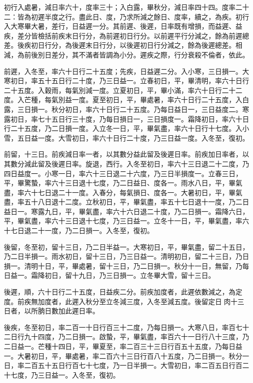 \begin{pinyinscope}
 初行入處暑，減日率六十，度率三十；入白露，畢秋分，減日率四十四。度率二十二：皆為初遲半度之行。盡此日、度，乃求所減之餘日、度率，續之，為疾。初行入大寒畢大暑，差行，日益遲一分。其前遲、後遲，日率既有增損，而益遲、益疾，差分皆檢括前疾末日行分，為前遲初日行分。以前遲平行分減之，餘為前遲總差。後疾初日行分，為後遲末日行分，以後遲初日行分減之，餘為後遲總差。相減，為前後別日差分，其不滿者皆調為小分。遲疾之際，行分衰殺不倫者，依此。



 前遲，入冬至，率六十日行二十五度；先疾，日益遲二分。入小寒，三日損一。大寒初日，率五十五日行二十度，乃三日益一。立春初日，平，畢清明，率六十日行二十五度。入穀雨，每氣別減一度。立夏初日，平，畢小滿，率六十日行二十二度。入芒種，每氣別益一度。夏至初日，平，畢處暑，率六十日行二十五度，入白露，三日損一。秋分初日，率六十日行二十五度。乃每日益日一，三日益度二。寒露初日，率七十五日行三十度，乃每日損日一，三日損度一。霜降初日，率六十日行二十五度，乃二日損一度。入立冬一日，平，畢氣盡，率六十日行十七度。入小雪，五日益一度。大雪初日，率六十日行二十度，乃三日益一度。入冬至，復初。



 前留，十三日。前疾減日率一者，以其數分益此留及後遲日率。前疾加日率者，以其數分減此留及後遲日率。旋退，西行。入冬至初日，率六十三日退二十二度，乃四日益度一。小寒一日，率六十三日退二十六度，乃三日半損度一。立春三日，平，畢驚蟄，率六十三日退十七度，乃二日益日、度各一。雨水八日，平，畢氣盡，率六十七日退二十一度。入春分，每氣損日、度各一。大暑初日，平，畢氣盡，率五十八日退十二度。立秋初日，平，畢氣盡，率五十七日退十一度，乃二日益日一。寒露九日，平，畢氣盡，率六十六日退二十度，乃二日損一。霜降六日，平，畢氣盡，率六十三日退十七度，乃三日益一。立冬十一日，平，畢氣盡，率六十七日退二十一度，乃二日損一。入冬至，復初。



 後留，冬至初，留十三日，乃二日半益一。大寒初日，平，畢氣盡，留二十五日，乃二日半損一。雨水初日，留十三日，乃三日益一。清明初日，留二十三日，乃日損一。清明十日，平，畢處暑，留十三日，乃二日損一。秋分十一日，無留，乃每日益一。霜降初日，留十九日，乃三日損一。立冬畢大雪，留十三日。



 後遲，順，六十日行二十五度，日益疾二分。前疾加度者，此遲依數減之，為定度。前疾無加度者，此遲入秋分至立冬減三度，入冬至減五度。後留定日肉十三日者，以所朒日數加此遲日率。



 後疾，冬至初日，率二百一十日行百三十二度，乃每日損一。大寒八日，率百七十二日行九十四度，乃二日損一。啟蟄，平，畢氣盡，率百六十一日行八十三度，乃二日益一。芒種十四日，平，畢夏至，率二百三十三日行百五十五度，乃每日益一。大暑初日，平，畢處暑，率二百六十三日行百八十五度，乃二日損一。秋分一日，率二百五十五日行百七十七度，乃一日半損一。大雪初日，率二百五日行百二十七度，乃三日益一。入冬至，復初。




\end{pinyinscope}
